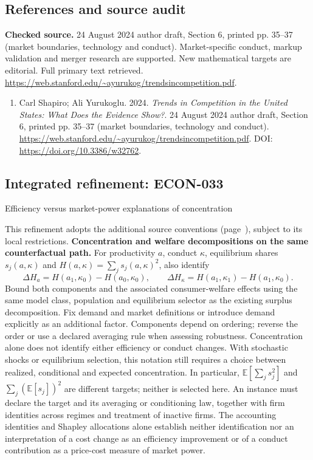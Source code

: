 \documentclass[11pt,a4paper]{article}
\newcommand{\E}{\mathbb E}
\begin{document}
\subsection*{References and source audit}
\textbf{Checked source.} 24 August 2024 author draft, Section 6, printed pp. 35--37 (market boundaries, technology and conduct). Market-specific conduct, markup validation and merger research are supported. New mathematical targets are editorial. Full primary text retrieved. \url{https://web.stanford.edu/~ayurukog/trendsincompetition.pdf}.
\begin{enumerate}\raggedright
\item\hypertarget{definitions:source:30007672:1}{} Carl Shapiro; Ali Yurukoglu. 2024. \emph{Trends in Competition in the United States: What Does the Evidence Show?}. 24 August 2024 author draft, Section 6, printed pp. 35--37 (market boundaries, technology and conduct).
\url{https://web.stanford.edu/~ayurukog/trendsincompetition.pdf}.
DOI: \url{https://doi.org/10.3386/w32762}.
\end{enumerate}

\subsection*{Integrated refinement: ECON-033}
{\sffamily\small\color{muted}Efficiency versus market-power explanations of concentration\par}
This refinement adopts the additional source conventions
(page~\pageref{audited:conventions}), subject to its local restrictions.
\textbf{Concentration and welfare decompositions on the same counterfactual path.}
For productivity $a$, conduct $\kappa$, equilibrium shares $s_j(a,\kappa)$ and
$H(a,\kappa)=\sum_js_j(a,\kappa)^2$, also identify
\[
\Delta H_a=H(a_1,\kappa_0)-H(a_0,\kappa_0),\qquad
\Delta H_\kappa=H(a_1,\kappa_1)-H(a_1,\kappa_0).
\]
Bound both components and the associated consumer-welfare effects using the same
model class, population and equilibrium selector as the existing surplus
decomposition. Fix demand and market definitions or introduce demand explicitly
as an additional factor. Components depend on ordering; reverse the order or use
a declared averaging rule when assessing robustness. Concentration alone does
not identify either efficiency or conduct changes.
With stochastic shocks or equilibrium selection, this notation still requires a choice between realized, conditional and expected concentration. In particular, \(\E[\sum_j s_j^2]\) and \(\sum_j(\E[s_j])^2\) are different targets; neither is selected here. An instance must declare the target and its averaging or conditioning law, together with firm identities across regimes and treatment of inactive firms. The accounting identities and Shapley allocations alone establish neither identification nor an interpretation of a cost change as an efficiency improvement or of a conduct contribution as a price-cost measure of market power.
\end{document}
